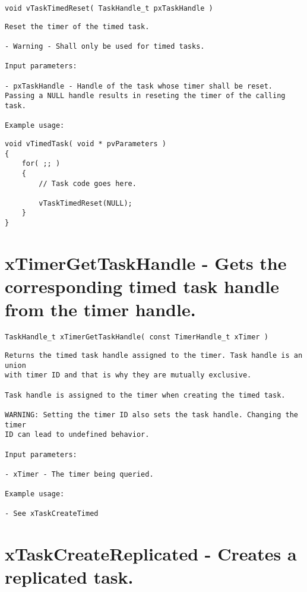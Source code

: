 \begin{verbatim}
void vTaskTimedReset( TaskHandle_t pxTaskHandle )
\end{verbatim}

\begin{lstlisting}
Reset the timer of the timed task.

- Warning - Shall only be used for timed tasks.

Input parameters:

- pxTaskHandle - Handle of the task whose timer shall be reset.
Passing a NULL handle results in reseting the timer of the calling task.

Example usage:
\end{lstlisting}

\begin{verbatim}
void vTimedTask( void * pvParameters )
{
    for( ;; )
    {
        // Task code goes here.

        vTaskTimedReset(NULL);
    }
}
\end{verbatim}

\section{xTimerGetTaskHandle -  Gets the corresponding timed task handle from the timer handle.}
\label{rt_cmd:xTimerGetTaskHandle}
\begin{verbatim}
TaskHandle_t xTimerGetTaskHandle( const TimerHandle_t xTimer )
\end{verbatim}
\begin{lstlisting}
Returns the timed task handle assigned to the timer. Task handle is an union
with timer ID and that is why they are mutually exclusive.

Task handle is assigned to the timer when creating the timed task.

WARNING: Setting the timer ID also sets the task handle. Changing the timer
ID can lead to undefined behavior.

Input parameters:

- xTimer - The timer being queried.

Example usage:

- See xTaskCreateTimed

\end{lstlisting}
\section{xTaskCreateReplicated -  Creates a replicated task.}
\label{rt_cmd:xTaskCreateReplicated}

